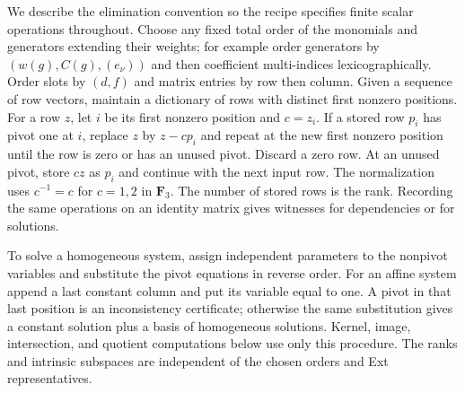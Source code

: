 \documentclass[11pt]{article}
\theoremstyle{definition}
\theoremstyle{remark}
\numberwithin{equation}{section}
\begin{document}
We describe the elimination convention so the recipe specifies finite
scalar operations throughout.  Choose any fixed total order of the
monomials and generators extending their weights; for example order
generators by $(w(g),C(g),(e_\nu))$ and then coefficient multi-indices
lexicographically.  Order slots by $(d,f)$ and matrix entries by row
then column.  Given a sequence of row vectors, maintain a dictionary
of rows with distinct first nonzero positions.  For a row $z$, let $i$
be its first nonzero position and $c=z_i$.  If a stored row $p_i$ has
pivot one at $i$, replace $z$ by $z-cp_i$ and repeat at the new first
nonzero position until the row is zero or has an unused pivot.
Discard a zero row.  At an unused pivot, store $c z$ as
$p_i$ and continue with the next input row.  The normalization uses
$c^{-1}=c$ for $c=1,2$ in $\mathbf F_3$.  The number of stored rows is the
rank.  Recording the same operations on an identity matrix gives
witnesses for dependencies or for solutions.

To solve a homogeneous system, assign independent parameters to the
nonpivot variables and substitute the pivot equations in reverse
order.  For an affine system append a last constant column and put its
variable equal to one.  A pivot in that last position is an
inconsistency certificate; otherwise the same substitution gives a
constant solution plus a basis of homogeneous solutions.  Kernel,
image, intersection, and quotient computations below use only this
procedure.  The ranks and intrinsic subspaces are independent of the
chosen orders and Ext representatives.
\end{document}
